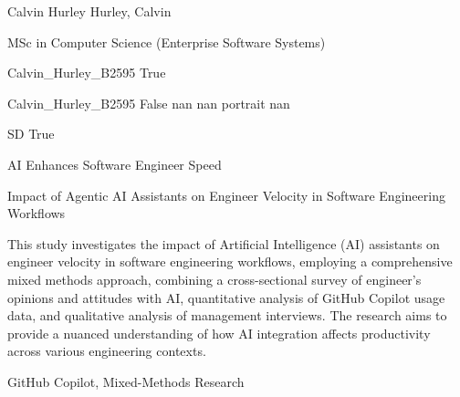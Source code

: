 \documentclass[twoside]{report}
\begin{document}
\begingroup{}\relax



\def\Key{Calvin_Hurley_B2595}

{Calvin Hurley}
{Hurley, Calvin}

{MSc in Computer Science (Enterprise Software Systems)}

{Calvin_Hurley_B2595}
{True}

{Calvin_Hurley_B2595}
{False}
{nan}
{nan}
{portrait}
{nan}

{SD}
{True}

{AI Enhances Software Engineer Speed}

{Impact of Agentic AI Assistants on Engineer Velocity in Software Engineering Workflows}

{This study investigates the impact of Artificial Intelligence (AI) assistants on engineer velocity in software engineering workflows, employing a comprehensive mixed methods approach, combining a cross-sectional survey of engineer's opinions and attitudes with AI, quantitative analysis of GitHub Copilot usage data, and qualitative analysis of management interviews. The research aims to provide a nuanced understanding of how AI integration affects productivity across various engineering contexts.}

{{GitHub Copilot}, Mixed-Methods Research}
\end{document}

